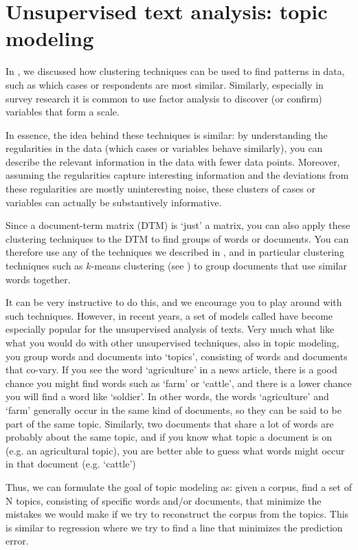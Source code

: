 \section{Unsupervised text analysis: topic modeling}
\label{sec:unsupervised}

In , we discussed how clustering techniques can be used to find patterns in data,
such as which cases or respondents are most similar.
Similarly, especially in survey research it is common to use factor analysis to discover (or confirm) variables that form a scale.

In essence, the idea behind these techniques is similar:
by understanding the regularities in the data (which cases or variables behave similarly),
you can describe the relevant information in the data with fewer data points.
Moreover, assuming the regularities capture interesting information and the deviations from these regularities are mostly
uninteresting noise, these clusters of cases or variables can actually be substantively informative.

Since a document-term matrix (DTM) is `just' a matrix, you can also apply these clustering techniques to the DTM
to find groups of words or documents. You can therefore use any of the techniques we described in , and in particular clustering techniques such as $k$-means clustering (see  ) to group documents that use similar words together. 

It can be very instructive to do this, and we encourage you to play around with such techniques. However, in recent years, a set of models called  have become especially popular for the unsupervised analysis of texts. Very much what like what you would do with other unsupervised techniques, also in topic modeling, you group words and documents into `topics', consisting of words and documents that co-vary.
If you see the word `agriculture' in a news article, there is a good chance you might find words such as `farm' or `cattle',
and there is a lower chance you will find a word like `soldier'.
In other words, the words `agriculture' and `farm' generally occur in the same kind of documents, so they can be said to be part of the same topic.
Similarly, two documents that share a lot of words are probably about the same topic,
and if you know what topic a document is on (e.g. an agricultural topic), you are better able to guess what words might occur in that document (e.g. `cattle')

Thus, we can formulate the goal of topic modeling as: given a corpus, find a set of N topics, consisting of specific words and/or documents, that minimize the mistakes we would make if we try to reconstruct the corpus from the topics.
This is similar to regression where we try to find a line that minimizes the prediction error.

